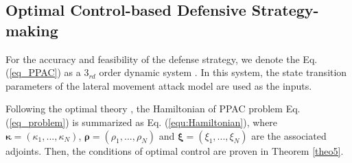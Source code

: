 \documentclass[lettersize,journal]{IEEEtran}
\begin{document}

\subsection{Optimal Control-based Defensive Strategy-making }\label{opt sys}
 For the accuracy and feasibility of the defense strategy, we denote the Eq. (\ref{eq_PPAC}) as a $3_{rd}$ order dynamic system \cite{bertsekas2019reinforcement}. In this system, the state transition parameters of the lateral movement attack model are used as the inputs. \par
 Following the optimal theory \cite{bertsekas2019reinforcement}, the Hamiltonian of PPAC problem Eq. (\ref{eq_problem}) is summarized as Eq. (\ref{equ:Hamiltonian}), where $\bm{\kappa}=(\kappa_1,...,\kappa_N)$, $\bm{\rho}=(\rho_1,...,\rho_N)$ and $\bm{\xi}=(\xi_1,...,\xi_N)$ are the associated adjoints. Then, the conditions of optimal control are proven in Theorem \ref{theo5}.
 
\end{document}
